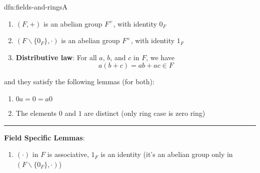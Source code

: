 \documentclass[landscape, 8pt]{extarticle}
\begin{document}
\begin{multicols}{3}
\begin{dfn}{dfn:fields-and-rings}{A}
\begin{multicols}{2}
        \begin{enumerate}[leftmargin=*]
            \setlength\itemsep{0em}
            \item $(F, +)$ is an abelian group $F^{+}$, with identity $0_{F}$
            \item $(F\backslash \{0_{F}\}, \cdot)$ is an abelian group $F^{\times}$, with identity $1_{F}$
            \item \textbf{Distributive law}: For all $a$, $b$, and $c$ in $F$, we have
                \[a(b + c) = ab + ac \in F\]
        \end{enumerate}
    \end{multicols}


    \vspace{-10pt}
    and they satisfy the following lemmas (for both):
    \vspace{-5pt}
    \begin{enumerate}
        \setlength\itemsep{0em}
        \item $0a = 0 = a 0$
        \item The elements $0$ and $1$ are distinct (only ring case is zero ring)
    \end{enumerate}

    \vspace{-8pt}
    \noindent\rule{\textwidth}{0.2pt}
    \textbf{Field Specific Lemmas}:
    \vspace{-3pt}
    \begin{enumerate}
        \setlength\itemsep{0em}
        \item $(\cdot)$ in $F$ is associative, $1_{F}$ is an identity (it's an abelian group only in $(F \backslash \{0_{F}\}, \cdot)$)
    \end{enumerate}
    

\end{dfn}
\end{multicols}
\end{document}

